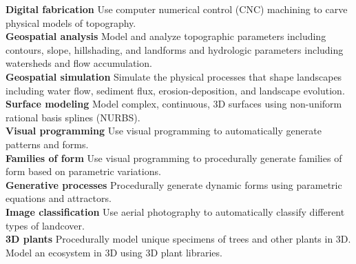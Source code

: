 \documentclass[11pt,article,oneside]{memoir}
\begin{document}
\noindent \textbf{Digital fabrication}
Use computer numerical control (CNC) machining 
to carve physical models of topography. \\
%

\noindent \textbf{Geospatial analysis}
Model and analyze topographic parameters including 
contours, slope, hillshading, and landforms
and hydrologic parameters 
including watersheds and flow accumulation. \\


\noindent \textbf{Geospatial simulation}
Simulate the physical processes that shape landscapes including
water flow, sediment flux, erosion-deposition, and landscape evolution.\\

\noindent \textbf{Surface modeling}
Model complex, continuous, 3D surfaces 
using non-uniform rational basis splines (NURBS).\\

\noindent \textbf{Visual programming}
Use visual programming to automatically generate
patterns and forms.\\
%

\noindent \textbf{Families of form}
Use visual programming to procedurally generate families of form
based on parametric variations.\\
%

\noindent \textbf{Generative processes}
Procedurally generate dynamic forms using 
parametric equations and attractors.\\

\noindent \textbf{Image classification}
Use aerial photography to automatically classify 
different types of landcover.\\

\noindent \textbf{3D plants}
Procedurally model unique specimens 
of trees and other plants in 3D.
Model an ecosystem in 3D using 3D plant libraries.\\
%
\end{document}

